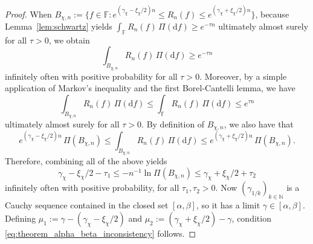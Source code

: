 \documentclass[11pt,twoside]{article}
\def\NN{\mathbb{N}}
\def\FF{\mathbb{F}}
\def\FF{\mathbb{F}}
\begin{document}
\begin{proof}
    When $B_{\chi,n}:=\big\{f\in\FF : e^{(\gamma_\chi - \xi_\chi/2) n}\leq R_n(f)\leq e^{(\gamma_\chi+\xi_\chi/2) n}\big\}$, because Lemma~\ref{lem:schwartz} yields $\int_\mathbb F R_n(f)\, \Pi(\mathrm df)\geq e^{-\tau n}$ ultimately almost surely for all $\tau>0$, we obtain
    \begin{equation*}
        \int_{B_{\chi,n}} R_n(f)\, \Pi(\mathrm d f)\geq e^{-\tau n}
    \end{equation*}
    infinitely often with positive probability for all $\tau>0$. Moreover, by a simple application of Markov's inequality and the first Borel-Cantelli lemma, we have
    \begin{equation*}
        \int_{B_{\chi,n}} R_n(f)\, \Pi(\mathrm d f)\leq \int_{\mathbb F} R_n(f)\, \Pi(\mathrm d f)\leq e^{\tau n}
    \end{equation*}
    ultimately almost surely for all $\tau>0$. By definition of $B_{\chi,n}$, we also have that
    \begin{equation*}
        e^{(\gamma_\chi - \xi_\chi/2)n}\, \Pi(B_{\chi,n})\leq \int_{B_{\chi,n}} R_n(f)\, \Pi(\mathrm d f)\leq e^{(\gamma_\chi + \xi_\chi/2)n}\, \Pi(B_{\chi,n}).
    \end{equation*}
    Therefore, combining all of the above yields
    \begin{equation*}
        \gamma_\chi - \xi_\chi/2 - \tau_1 \leq -n^{-1}\ln\Pi(B_{\chi,n}) \leq \gamma_\chi + \xi_\chi/2 + \tau_2
    \end{equation*}
    infinitely often with positive probability, for all $\tau_1, \tau_2>0$. Now  $(\gamma_{1/k})_{k\in\NN}$ is a Cauchy sequence contained in the closed set $[\alpha,\beta]$, so it has a limit $\gamma\in[\alpha,\beta]$.
    Defining $\mu_1:=\gamma - (\gamma_\chi-\xi_\chi/2)$ and $\mu_2:=(\gamma_\chi+\xi_\chi/2)-\gamma$, condition \eqref{eq:theorem_alpha_beta_inconsistency} follows.
\end{proof}


\end{document}
